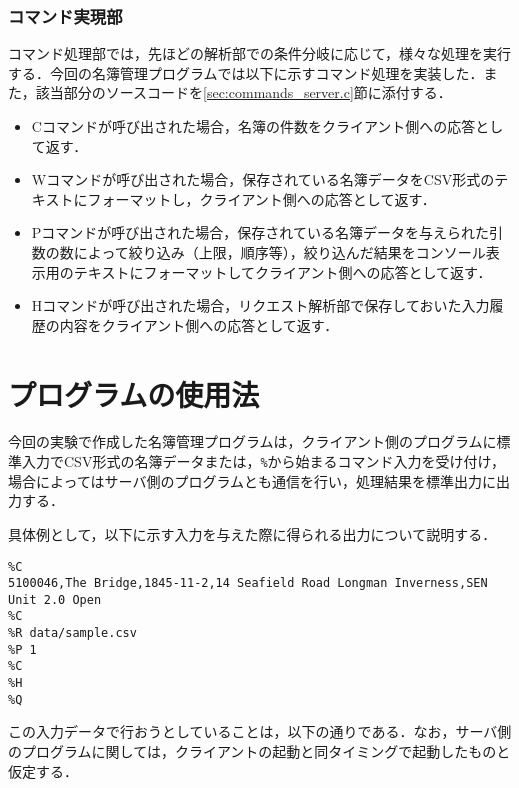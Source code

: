 \documentclass[11pt]{jsarticle}
\begin{document}
\subsubsection{コマンド実現部}

コマンド処理部では，先ほどの解析部での条件分岐に応じて，様々な処理を実行する．今回の名簿管理プログラムでは以下に示すコマンド処理を実装した．また，該当部分のソースコードを\ref{sec:commands_server.c}節に添付する．

\begin{itemize}
      \item Cコマンドが呼び出された場合，名簿の件数をクライアント側への応答として返す．
      \item Wコマンドが呼び出された場合，保存されている名簿データをCSV形式のテキストにフォーマットし，クライアント側への応答として返す．
      \item Pコマンドが呼び出された場合，保存されている名簿データを与えられた引数の数によって絞り込み（上限，順序等），絞り込んだ結果をコンソール表示用のテキストにフォーマットしてクライアント側への応答として返す．
      \item Hコマンドが呼び出された場合，リクエスト解析部で保存しておいた入力履歴の内容をクライアント側への応答として返す．
\end{itemize}

\section{プログラムの使用法}

今回の実験で作成した名簿管理プログラムは，クライアント側のプログラムに標準入力でCSV形式の名簿データまたは，{\tt \%}から始まるコマンド入力を受け付け，場合によってはサーバ側のプログラムとも通信を行い，処理結果を標準出力に出力する．

具体例として，以下に示す入力を与えた際に得られる出力について説明する．

{\small
\begin{verbatim}
%C
5100046,The Bridge,1845-11-2,14 Seafield Road Longman Inverness,SEN Unit 2.0 Open
%C
%R data/sample.csv
%P 1
%C
%H
%Q
\end{verbatim}
}

この入力データで行おうとしていることは，以下の通りである．なお，サーバ側のプログラムに関しては，クライアントの起動と同タイミングで起動したものと仮定する．
\end{document}
